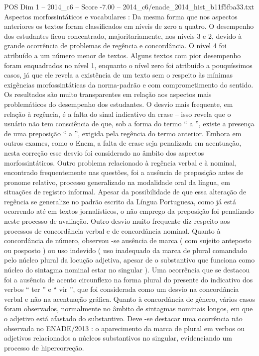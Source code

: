 \begin{textsample}{POS Dim 1 – 2014\_c6 – Score -7.00 – 2014\_c6/enade\_2014\_hist\_b11f5fba33.txt}
Aspectos morfossintáticos e vocabulares : Da mesma forma que nos aspectos anteriores os textos foram classificados em níveis de zero a quatro.
O desempenho dos estudantes ficou concentrado, majoritariamente, nos níveis 3 e 2, devido à grande ocorrência de problemas de regência e concordância.
O nível 4 foi atribuído a um número menor de textos.
Alguns textos com pior desempenho foram enquadrados no nível 1, enquanto o nível zero foi atribuído a pouquíssimos casos, já que ele revela a existência de um texto sem o respeito às mínimas exigências morfossintáticas da norma-padrão e com comprometimento do sentido.
Os resultados são muito transparentes em relação aos aspectos mais problemáticos do desempenho dos estudantes.
O desvio mais frequente, em relação à regência, é a falta do sinal indicativo da crase – isso revela que o usuário não tem consciência de que, sob a forma do termo “ a ”, existe a presença de uma preposição “ a ”, exigida pela regência do termo anterior.
Embora em outros exames, como o Enem, a falta de crase seja penalizada em acentuação, nesta correção esse desvio foi considerado no âmbito dos aspectos morfossintáticos.
Outro problema relacionado à regência verbal e à nominal, encontrado frequentemente nas questões, foi a ausência de preposição antes de pronome relativo, processo generalizado na modalidade oral da língua, em situações de registro informal.
Apesar da possibilidade de que essa alteração de regência se generalize no padrão escrito da Língua Portuguesa, como já está ocorrendo até em textos jornalísticos, o não emprego da preposição foi penalizado neste processo de avaliação.
Outro desvio muito frequente diz respeito aos processos de concordância verbal e de concordância nominal.
Quanto à concordância de número, observou -se ausência de marca ( com sujeito anteposto ou posposto ) ou uso indevido ( uso inadequado da marca de plural comandado pelo núcleo plural da locução adjetiva, apesar de o substantivo que funciona como núcleo do sintagma nominal estar no singular ).
Uma ocorrência que se destacou foi a ausência de acento circunflexo na forma plural do presente do indicativo dos verbos “ ter ” e “ vir ”, que foi considerada como um desvio na concordância verbal e não na acentuação gráfica.
Quanto à concordância de gênero, vários casos foram observados, normalmente no âmbito de sintagmas nominais longos, em que o adjetivo está afastado do substantivo.
Deve -se destacar uma ocorrência não observada no ENADE/2013 : o aparecimento da marca de plural em verbos ou adjetivos relacionados a núcleos substantivos no singular, evidenciando um processo de hipercorreção.

\end{textsample}
